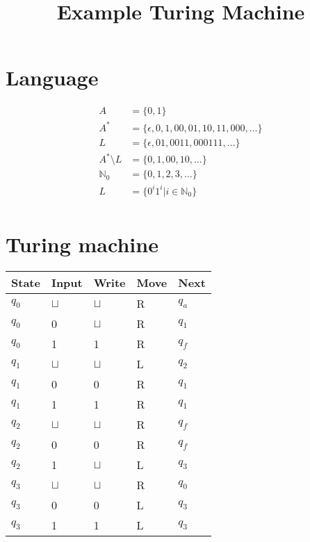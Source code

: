 \documentclass[a4paper, hidelinks, twocolumn, 9pt]{article}
\title{Example Turing Machine}
\author{}
\date{}
\newcommand{\blm}{\sqcup}
\newcommand{\bl}{\(\blm\)}
\begin{document}
  
  \maketitle
  \thispagestyle{fancy}

  \section*{Language}
  \begin{align*}
      A    &= \{ 0, 1 \} \\
      A^*  &= \{ \epsilon, 0, 1, 00, 01, 10, 11, 000, \ldots \} \\
      L    &= \{ \epsilon, 01, 0011, 000111, \ldots \} \\
      A^* \setminus L &= \{ 0, 1, 00, 10, \ldots \} \\[2mm]
    \mathbb{N}_0 &= \{ 0 , 1 , 2 , 3 , \ldots \} \\
      L &= \{ 0^i 1^i | i \in \mathbb{N}_0 \} \\
  \end{align*}
  
  \section*{Turing machine}
  \begin{center}
    \begin{tabular}{x{1cm}x{1cm}x{1cm}x{1cm}x{1cm}}
      \toprule
      State & Input & Write & Move & Next \\
      \midrule
      \(q_0\) & \bl & \bl & R & \(q_a\) \\
      \(q_0\) &   0 & \bl & R & \(q_1\) \\
      \(q_0\) &   1 &   1 & R & \(q_f\) \\
      \midrule
      \(q_1\) & \bl & \bl & L & \(q_2\) \\
      \(q_1\) &   0 &   0 & R & \(q_1\) \\
      \(q_1\) &   1 &   1 & R & \(q_1\) \\
      \midrule
      \(q_2\) & \bl & \bl & R & \(q_f\) \\
      \(q_2\) &   0 &   0 & R & \(q_f\) \\
      \(q_2\) &   1 & \bl & L & \(q_3\) \\
      \midrule
      \(q_3\) & \bl & \bl & R & \(q_0\) \\
      \(q_3\) &   0 &   0 & L & \(q_3\) \\
      \(q_3\) &   1 &   1 & L & \(q_3\) \\
      \bottomrule
    \end{tabular}
  \end{center}
\end{document}
